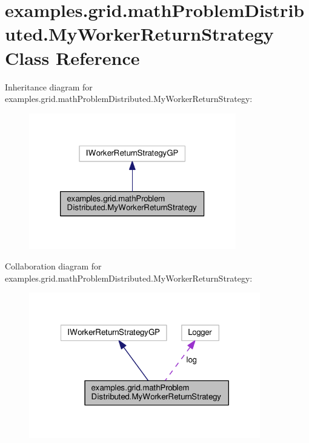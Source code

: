 \hypertarget{classexamples_1_1grid_1_1math_problem_distributed_1_1_my_worker_return_strategy}{\section{examples.\-grid.\-math\-Problem\-Distributed.\-My\-Worker\-Return\-Strategy Class Reference}
\label{classexamples_1_1grid_1_1math_problem_distributed_1_1_my_worker_return_strategy}
}


Inheritance diagram for examples.\-grid.\-math\-Problem\-Distributed.\-My\-Worker\-Return\-Strategy\-:
\nopagebreak
\begin{figure}[H]
\begin{center}
\leavevmode
\includegraphics[width=256pt]{classexamples_1_1grid_1_1math_problem_distributed_1_1_my_worker_return_strategy__inherit__graph}
\end{center}
\end{figure}


Collaboration diagram for examples.\-grid.\-math\-Problem\-Distributed.\-My\-Worker\-Return\-Strategy\-:
\nopagebreak
\begin{figure}[H]
\begin{center}
\leavevmode
\includegraphics[width=286pt]{classexamples_1_1grid_1_1math_problem_distributed_1_1_my_worker_return_strategy__coll__graph}
\end{center}
\end{figure}

